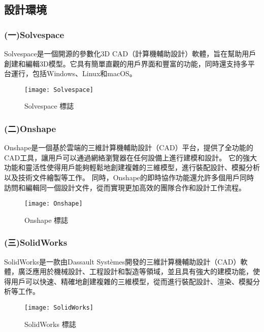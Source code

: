 \subsection{設計環境}

\subsubsection{(一)Solvespace}
\fontsize{14pt}{2.5pt}\sectionef\hspace{12pt}
Solvespace是一個開源的參數化3D CAD（計算機輔助設計）軟體，旨在幫助用戶創建和編輯3D模型。它具有簡單直觀的用戶界面和豐富的功能，同時還支持多平台運行，包括Windows、Linux和macOS。\\
\begin{figure}[hbt!]
\center
\texttt{[image: Solvespace]}
\caption{\Large Solvespace 標誌}
\end{figure}

\subsubsection{(二)Onshape}
\fontsize{14pt}{2.5pt}\sectionef\hspace{12pt}
Onshape是一個基於雲端的三維計算機輔助設計（CAD）平台，提供了全功能的CAD工具，讓用戶可以通過網絡瀏覽器在任何設備上進行建模和設計。
它的強大功能和靈活性使得用戶能夠輕鬆地創建複雜的三維模型，進行裝配設計、模擬分析以及技術文件繪製等工作。
同時，Onshape的即時協作功能還允許多個用戶同時訪問和編輯同一個設計文件，從而實現更加高效的團隊合作和設計工作流程。\\
\begin{figure}[hbt!]
\center
\texttt{[image: Onshape]}
\caption{\Large Onshape 標誌}
\end{figure}

\subsubsection{(三)SolidWorks}
\fontsize{14pt}{2.5pt}\sectionef\hspace{12pt}
SolidWorks是一款由Dassault Systèmes開發的三維計算機輔助設計（CAD）軟體，廣泛應用於機械設計、工程設計和製造等領域，並且具有強大的建模功能，使得用戶可以快速、精確地創建複雜的三維模型，從而進行裝配設計、渲染、模擬分析等工作。\\
\begin{figure}[hbt!]
\center
\texttt{[image: SolidWorks]}
\caption{\Large SolidWorks 標誌}
\end{figure}


